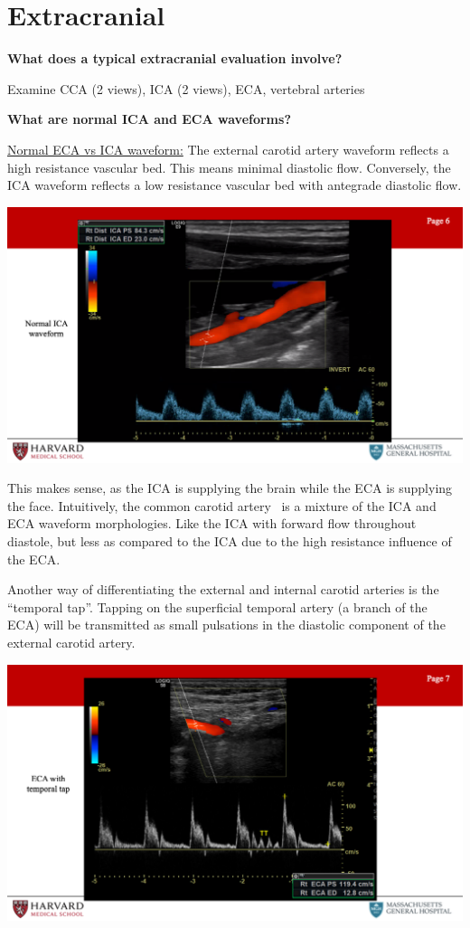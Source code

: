 \documentclass[
]{book}
\begin{document}
\hypertarget{extracranial}{%
\section{Extracranial}\label{extracranial}}

\textbf{What does a typical extracranial evaluation involve?}

Examine CCA (2 views), ICA (2 views), ECA, vertebral arteries

\textbf{What are normal ICA and ECA waveforms?}

\uline{Normal ECA vs ICA waveform:} The external carotid artery
waveform reflects a high resistance vascular bed. This means minimal
diastolic flow. Conversely, the ICA waveform reflects a low resistance
vascular bed with antegrade diastolic flow.

\includegraphics[width=15.01in]{images/vasc_lab2/Slide7}

This makes sense, as the ICA is supplying the brain while the ECA is
supplying the face. Intuitively, the common carotid artery~ is a mixture
of the ICA and ECA waveform morphologies. Like the ICA with forward flow
throughout diastole, but less as compared to the ICA due to the high
resistance influence of the ECA.

Another way of differentiating the external and internal carotid
arteries is the ``temporal tap''. Tapping on the superficial temporal
artery (a branch of the ECA) will be transmitted as small pulsations in
the diastolic component of the external carotid artery.\citep{pellerito2019, size2013}

\includegraphics[width=15.01in]{images/vasc_lab2/Slide8}
\end{document}
